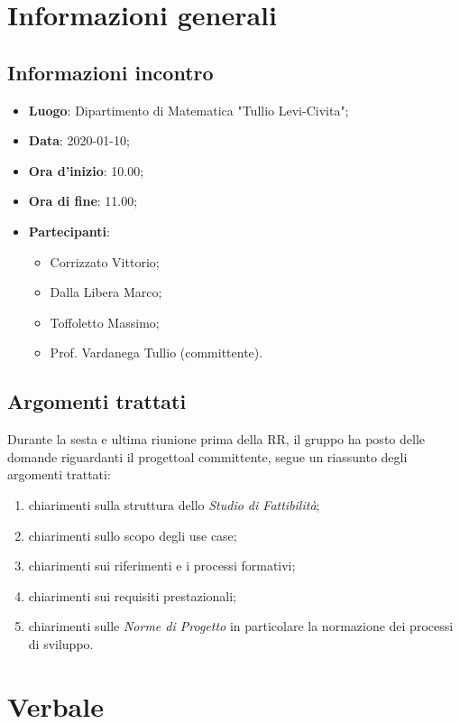 \section{Informazioni generali}
    \subsection{Informazioni incontro}
        \begin{itemize}
            \item \textbf{Luogo}: Dipartimento di Matematica "Tullio Levi-Civita";
            \item \textbf{Data}: 2020-01-10;
            \item \textbf{Ora d'inizio}: 10.00;
            \item \textbf{Ora di fine}: 11.00;
            \item \textbf{Partecipanti}: \begin{itemize}
                \item Corrizzato Vittorio;
                \item Dalla Libera Marco;
                \item Toffoletto Massimo;
                \item Prof. Vardanega Tullio (committente).
            \end{itemize}
        \end{itemize}
    \subsection{Argomenti trattati}
        Durante la sesta e ultima riunione prima della RR, il gruppo ha posto delle domande riguardanti il progetto\glosp al committente, segue un riassunto degli argomenti trattati:
        \begin{enumerate}
            \item chiarimenti sulla struttura dello \textit{Studio di Fattibilità};
            \item chiarimenti sullo scopo degli use case;
            \item chiarimenti sui riferimenti e i processi formativi;
            \item chiarimenti sui requisiti prestazionali;
            \item chiarimenti sulle \textit{Norme di Progetto} in particolare la normazione dei processi di sviluppo.
        \end{enumerate}
\section{Verbale}
